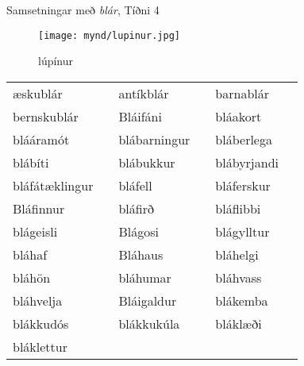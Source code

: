 \documentclass[../samsetningasafn.tex]{subfiles}
\begin{document}
\begin{wordlist}[H]
\begin{tcolorbox}
\end{tcolorbox}
	\caption{Samsetningar með \textit{blár}, Tíðni 4}
	\label{listi:blatt.4}
\end{wordlist}

\begin{figure}[H]
\begin{tcolorbox}
\centering
	\texttt{[image: mynd/lupinur.jpg]}
\end{tcolorbox}
	\caption{lúpínur}
	\label{mynd:lupinur}
\end{figure}

\begin{wordlist}[H]
\begin{tcolorbox}

	\setlength{\extrarowheight}{3pt}
	\begin{tabular}{BlBlBl}	
		æskublár	&	\phantom{baa}	& 		
		antíkblár	&	\phantom{baa}	& 		
		barnablár	&	\phantom{baa}	\\ 		%
		bernskublár	&		& 		
		Bláifáni		&		& 		
		bláakort		&		\\ 	%
		blááramót	&		& 		
		blábarningur	&		& 	
		bláberlega	&		\\ 		%
		blábíti		&		& 	
		blábukkur	&		& 		
		blábyrjandi	&		\\ 	%
		bláfátæklingur &		& 		
		bláfell		&		& 		
		bláferskur	&		\\ 	%
		Bláfinnur	&		& 	
		bláfirð		&		& 	
		bláflibbi		&		\\ 		%
		blágeisli		&		& 		
		Blágosi		&		& 		
		blágylltur	&		\\ 		%
		bláhaf		&		& 		
		Bláhaus		&		& 	
		bláhelgi		&		\\ 		%
		bláhön		&		& 		
		bláhumar	&		& 		
		bláhvass	&		\\ 	%
		bláhvelja	&		& 	
		Bláigaldur	&		& 		
		blákemba	&		\\ 		%
		blákkudós	&		& 	
		blákkukúla	&		& 		
		bláklæði		&		\\ 	%
		bláklettur	&		& 	

\end{tabular}
\end{tcolorbox}
\end{wordlist}
\end{document}
